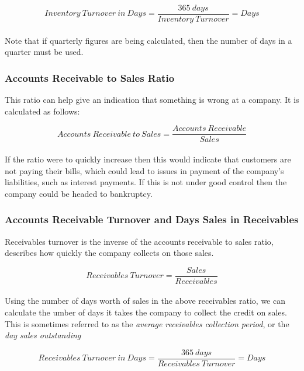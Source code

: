 \documentclass{article}
\begin{document}
\begin{equation}
    Inventory\: Turnover\: in\: Days = \frac{365\: days}{Inventory\: Turnover} = Days
\end{equation}\\

Note that if quarterly figures are being calculated, then the number of days in a quarter must be used. 

\subsubsection{Accounts Receivable to Sales Ratio}
This ratio can help give an indication that something is wrong at a company. It is calculated as follows:

\begin{equation}
    Accounts\: Receivable\: to\: Sales = \frac{Accounts\: Receivable}{Sales} 
\end{equation}\\

If the ratio were to quickly increase then this would indicate that customers are not paying their bills, which could lead to issues in payment of the company's liabilities, such as interest payments. If this is not under good control then the company could be headed to bankruptcy. 

\subsubsection{Accounts Receivable Turnover and Days Sales in Receivables}
Receivables turnover is the inverse of the accounts receivable to sales ratio, describes how quickly the company collects on those sales. 

\begin{equation}
    Receivables\: Turnover= \frac{Sales}{Receivables} 
\end{equation}\\

Using the number of days worth of sales in the above receivables ratio, we can calculate the umber of days it takes the company to collect the credit on sales. This is sometimes referred to as the \textit{average receivables collection period}, or the \textit{day sales outstanding}

\begin{equation}
    Receivables\: Turnover\: in\: Days = \frac{365\: days}{Receivables\: Turnover} = Days
\end{equation}\\
\end{document}
